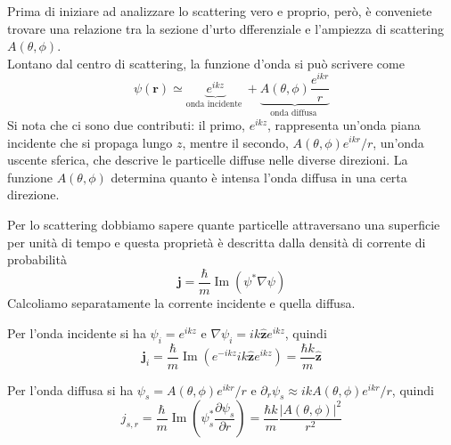 Prima di iniziare ad analizzare lo scattering vero e proprio, però, è conveniete trovare una relazione tra la sezione d'urto dfferenziale e l'ampiezza di scattering $A(\theta, \phi)$. \\
Lontano dal centro di scattering, la funzione d'onda si può scrivere come 
\begin{equation}
\psi(\mathbf{r}) \simeq \underbrace{e^{i k z}}_{\text {onda incidente }}+\underbrace{A(\theta, \phi) \frac{e^{i k r}}{r}}_{\text {onda diffusa }}
\end{equation}
Si nota che ci sono due contributi: il primo, $e^{ikz}$, rappresenta un'onda piana incidente che si propaga lungo $z$, mentre il secondo, $A(\theta, \phi) e^{ikr}/r$, un'onda uscente sferica, che descrive le particelle diffuse nelle diverse direzioni. La funzione $A(\theta, \phi)$ determina quanto è intensa l'onda diffusa in una certa direzione.

Per lo scattering dobbiamo sapere quante particelle attraversano una superficie per unità di tempo e questa proprietà è descritta dalla densità di corrente di probabilità 
\begin{equation}
    \mathbf{j} = \frac{\hbar}{m}\operatorname{Im}(\psi^* \nabla \psi )
\end{equation}
Calcoliamo separatamente la corrente incidente e quella diffusa. 

Per l'onda incidente si ha $\psi_i = e^{ikz}$ e $\nabla \psi_i = ik\hat{\mathbf{z}} e^{ikz}$, quindi 
\begin{equation}
\label{eq:corrente_incidente}
    \mathbf{j}_i = \frac{\hbar}{m} \operatorname{Im}(e^{-ikz} i k \hat{\mathbf{z}}e^{ikz}) = \frac{\hbar k}{m} \hat{\mathbf{z}}
\end{equation}

Per l'onda diffusa si ha $\psi_s = A(\theta, \phi) e^{ikr}/r$ e $\partial_r \psi_s \approx ik A(\theta, \phi) e^{ikr}/r$, quindi 
\begin{equation}
\label{eq:corrente_diffratta}
    j_{s,r} = \frac{\hbar}{m} \operatorname{Im}\left( \psi_s^* \frac{\partial \psi_s}{\partial r} \right) = \frac{\hbar k}{m} \frac{|A(\theta,\phi)|^2}{r^2}
\end{equation}

